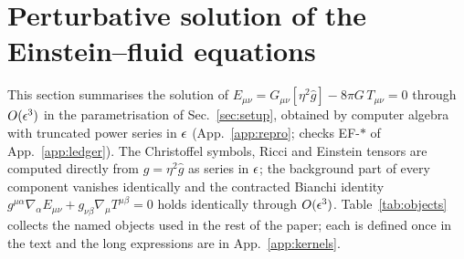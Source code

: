 \section{Perturbative solution of the Einstein--fluid equations}
\label{sec:einstein}

This section summarises the solution of $E_{\mu\nu}=G_{\mu\nu}[\eta^2\hat g]-8\pi G\,T_{\mu\nu}=0$ through
$O(\epsilon^3)$ in the parametrisation of Sec.~\ref{sec:setup}, obtained by computer algebra with truncated power series in $\epsilon$
(App.~\ref{app:repro}; checks EF-$\ast$ of App.~\ref{app:ledger}).  The Christoffel symbols,
Ricci and Einstein tensors are computed directly from $g=\eta^2\hat g$ as series in $\epsilon$; the background
part of every component vanishes identically and the contracted Bianchi identity
$g^{\mu\alpha}\nabla_\alpha E_{\mu\nu}+g_{\nu\beta}\nabla_\mu T^{\mu\beta}=0$ holds identically through
$O(\epsilon^3)$.  Table~\ref{tab:objects} collects the named objects used in the rest of the paper; each is defined
once in the text and the long expressions are in App.~\ref{app:kernels}.

